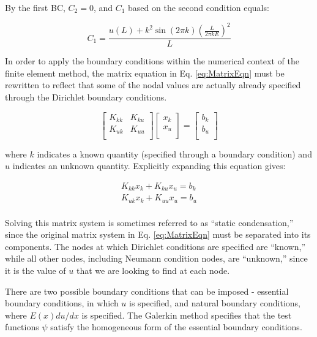 \documentclass[10pt]{article}
\begin{document}
By the first BC, \(C_2=0\), and \(C_1\) based on the second condition equals:

\begin{equation}
C_1=\frac{u(L)+k^2\sin{(2\pi k)}\left(\frac{L}{2\pi k E}\right)^2}{L}
\end{equation}

In order to apply the boundary conditions within the numerical context of the finite element method, the matrix equation in Eq. \eqref{eq:MatrixEqn} must be rewritten to reflect that some of the nodal values are actually already specified through the Dirichlet boundary conditions. 

\begin{equation}
\begin{bmatrix}
	K_{kk} & K_{ku}\\
	K_{uk} & K_{uu}\\
\end{bmatrix}
\begin{bmatrix}
	x_k\\
	x_u\\
\end{bmatrix}
=
\begin{bmatrix}
	b_k\\
	b_u\\
\end{bmatrix}
\end{equation}

where \(k\) indicates a known quantity (specified through a boundary condition) and \(u\) indicates an unknown quantity.   Explicitly expanding this equation gives:

\begin{equation}
\begin{aligned}
K_{kk}x_k+K_{ku}x_u=b_k\\
K_{uk}x_k+K_{uu}x_u=b_u\\
\end{aligned}
\end{equation}

Solving this matrix system is sometimes referred to as ``static condensation,'' since the original matrix system in Eq. \eqref{eq:MatrixEqn} must be separated into its components. The nodes at which Dirichlet conditions are specified are ``known,'' while all other nodes, including Neumann condition nodes, are ``unknown,'' since it is the value of \(u\) that we are looking to find at each node.


There are two possible boundary conditions that can be imposed - essential boundary conditions, in which \(u\) is specified, and natural boundary conditions, where \(E(x)du/dx\) is specified. The Galerkin method specifies that the test functions \(\psi\) satisfy the homogeneous form of the essential boundary conditions. 
\end{document}
